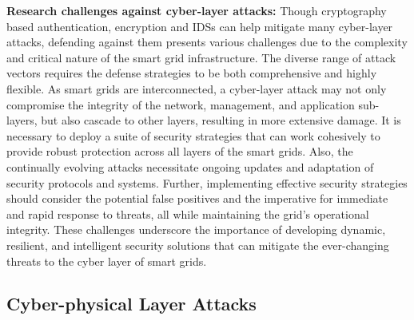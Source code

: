 \documentclass[10pt, journal]{IEEEtran}
\begin{document}
\textbf{Research challenges against cyber-layer attacks:} Though cryptography based authentication, encryption and IDSs can help mitigate many cyber-layer attacks, defending against them presents various challenges due to the complexity and critical nature of the smart grid infrastructure. The diverse range of attack vectors requires the defense strategies to be both comprehensive and highly flexible. As smart grids are interconnected, a cyber-layer attack may not only compromise the integrity of the network, management, and application sub-layers, but also cascade to other layers, resulting in more extensive damage. It is necessary to deploy a suite of security strategies that can work cohesively to provide robust protection across all layers of the smart grids. Also, the continually evolving attacks necessitate ongoing updates and adaptation of security protocols and systems. Further, implementing effective security strategies should consider the potential false positives and the imperative for immediate and rapid response to threats, all while maintaining the grid's operational integrity. These challenges underscore the importance of developing dynamic, resilient, and intelligent security solutions that can mitigate the ever-changing threats to the cyber layer of smart grids.

\subsection{Cyber-physical Layer Attacks}
\end{document}
